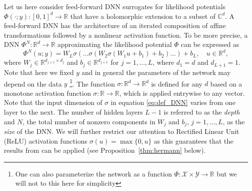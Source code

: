 \documentclass[final]{siamart171218}
\newcommand{\mcl}{\mathcal}
\newcommand{\mbb}{\mathbb}
\newcommand{\R}{\mbb{R}}
\newcommand{\mX}{\mcl{X}}
\newcommand{\mY}{\mcl{Y}}
\begin{document}
Let us here consider feed-forward DNN surrogates for likelihood potentials 
$\Phi(\cdot; y) : [0,1]^d \to \R$ that have a holomorphic extension to
a subset of
${\mathbb C}^d$. A feed-forward DNN has the architecture of an iterated composition of affine transformations followed by a nonlinear activation function. 
To be more precise, a DNN $\Phi^N : \R^d \to \R$ approximating the likelihood potential $\Phi$ can be expressed as
\begin{equation}
	\label{eq:def_DNN}
	\Phi^N(u; y) = W_L \sigma(\ldots\sigma(W_2\sigma(W_1 u + b_1) + b_2)\ldots)+b_L, \quad u\in \R^d,
\end{equation}
where $W_j \in \R^{d_{j+1}\times d_{j}}$ and $b_j \in \R^{d_{j+1}}$ for $j=1,...,L$, where $d_1 = d$ and $d_{L+1} = 1$. Note that here we fixed $y$ and in general the parameters of the network may 
depend on the data $y$ \footnote{One can also parameterize the network as a 
function $\Phi: \mX \times \mY \to \R$ but we will not to this here for simplicity}. The function $\sigma : \R^d \to \R^d$ is defined for any $d$ based on a monotone activation function $\sigma: \R \to \R$, which is applied entrywise to any vector. 
Note that the input dimension of $\sigma$ in equation \eqref{eq:def_DNN} varies from one 
layer to the next.
The number of hidden layers $L-1$ is referred to as the {\it depth} and $N$, the total number of nonzero components in $W_j$ and $b_j$, $j=1,...,L$, as the {\it size} of the DNN.
We will further restrict our attention to Rectified Linear Unit (ReLU) activation functions $\sigma(u) = \max\{0, u\}$ as this guarantees that the results from \cite{herrmann2020deep} can be applied (see Proposition~\ref{thm:hermann} below).
\end{document}
